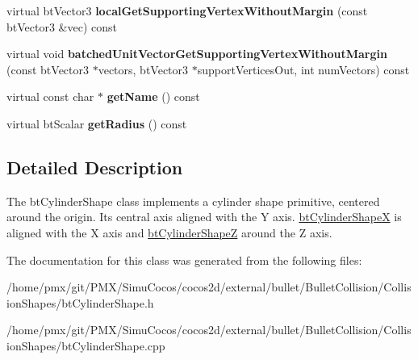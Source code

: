 \begin{DoxyCompactItemize}
virtual bt\+Vector3 {\bfseries local\+Get\+Supporting\+Vertex\+Without\+Margin} (const bt\+Vector3 \&vec) const
\item 
\mbox{\label{classbtCylinderShapeX_af9bbbe5b821f76436d9c46046314d9f5}} 
virtual void {\bfseries batched\+Unit\+Vector\+Get\+Supporting\+Vertex\+Without\+Margin} (const bt\+Vector3 $\ast$vectors, bt\+Vector3 $\ast$support\+Vertices\+Out, int num\+Vectors) const
\item 
\mbox{\label{classbtCylinderShapeX_a67b686b5fee1d75fad2edb51b4276693}} 
virtual const char $\ast$ {\bfseries get\+Name} () const
\item 
\mbox{\label{classbtCylinderShapeX_a2c5d11fee8f7f21c9a500b22738b0a13}} 
virtual bt\+Scalar {\bfseries get\+Radius} () const
\end{DoxyCompactItemize}


\subsection{Detailed Description}
The bt\+Cylinder\+Shape class implements a cylinder shape primitive, centered around the origin. Its central axis aligned with the Y axis. \hyperlink{classbtCylinderShapeX}{bt\+Cylinder\+ShapeX} is aligned with the X axis and \hyperlink{classbtCylinderShapeZ}{bt\+Cylinder\+ShapeZ} around the Z axis. 

The documentation for this class was generated from the following files\+:\begin{DoxyCompactItemize}
\item 
/home/pmx/git/\+P\+M\+X/\+Simu\+Cocos/cocos2d/external/bullet/\+Bullet\+Collision/\+Collision\+Shapes/bt\+Cylinder\+Shape.\+h\item 
/home/pmx/git/\+P\+M\+X/\+Simu\+Cocos/cocos2d/external/bullet/\+Bullet\+Collision/\+Collision\+Shapes/bt\+Cylinder\+Shape.\+cpp\end{DoxyCompactItemize}
